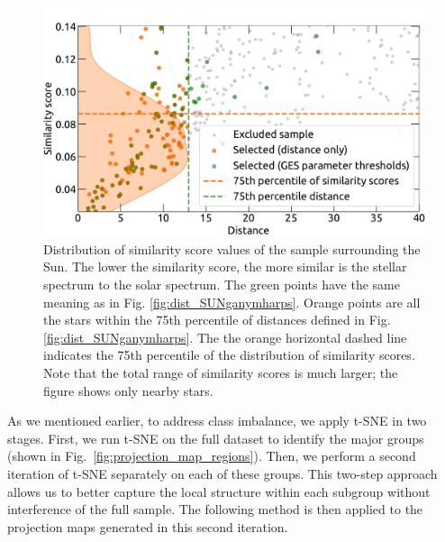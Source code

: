 \documentclass{aa}
\begin{document}
\begin{figure}[t]
  \centering
  \includegraphics[width=\linewidth]{Plots/SUNuul_GES_score.pdf}
  \caption{Distribution of similarity score values of the sample surrounding the Sun. The lower the similarity score, the more similar is the stellar spectrum to the solar spectrum. The green points have the same meaning as in Fig. \ref{fig:dist_SUNganymharps}. Orange points are all the stars within the 75th percentile of distances defined in Fig. \ref{fig:dist_SUNganymharps}. The the orange horizontal dashed line indicates the 75th percentile of the distribution of similarity scores. Note that the total range of similarity scores is much larger; the figure shows only nearby stars.}
  \label{fig:simscore}
\end{figure}

As we mentioned earlier, to address class imbalance, we apply t-SNE in two stages. First, we run t-SNE on the full dataset to identify the major groups (shown in Fig.\ \ref{fig:projection_map_regions}). Then, we perform a second iteration of t-SNE separately on each of these groups. This two-step approach allows us to better capture the local structure within each subgroup without interference of the full sample. The following method is then applied to the projection maps generated in this second iteration.
\end{document}
